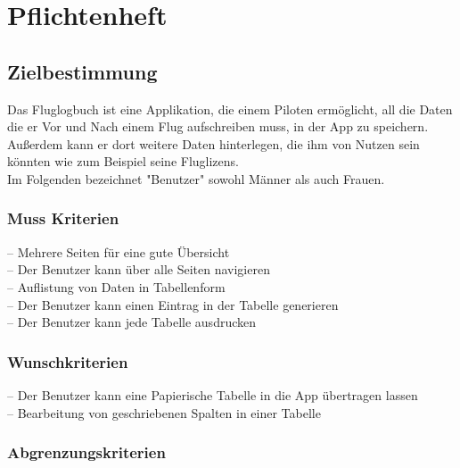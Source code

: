 \documentclass[a4paper]{article} %
\begin{document}
    \section{Pflichtenheft}
    \vspace{1cm}
    \subsection{Zielbestimmung}
    Das Fluglogbuch ist eine Applikation, die einem Piloten ermöglicht, all die Daten die er Vor und Nach einem Flug aufschreiben muss, in der App zu speichern. Außerdem kann er dort weitere Daten hinterlegen, die ihm von Nutzen sein könnten wie zum Beispiel seine Fluglizens.\\
    Im Folgenden bezeichnet "Benutzer" sowohl Männer als auch Frauen.\\
    
    \subsubsection{Muss Kriterien}
    \vspace{0.5cm}
    \begin{description}
    \item[-- Mehrere Seiten für eine gute Übersicht]\hfill
    \item[-- Der Benutzer kann über alle Seiten navigieren]\hfill
    \item[-- Auflistung von Daten in Tabellenform]\hfill 
    \item[-- Der Benutzer kann einen Eintrag in der Tabelle generieren]\hfill 
    \item[-- Der Benutzer kann jede Tabelle ausdrucken]\hfill
    \end{description}

    \subsubsection{Wunschkriterien}
    \vspace{0.5cm}
    \begin{description}
    \item[-- Der Benutzer kann eine Papierische Tabelle in die App übertragen lassen]\hfill
    \item[-- Bearbeitung von geschriebenen Spalten in einer Tabelle] 
    \end{description}
    
    \subsubsection{Abgrenzungskriterien}
    \vspace{0.5cm}
\end{document}
